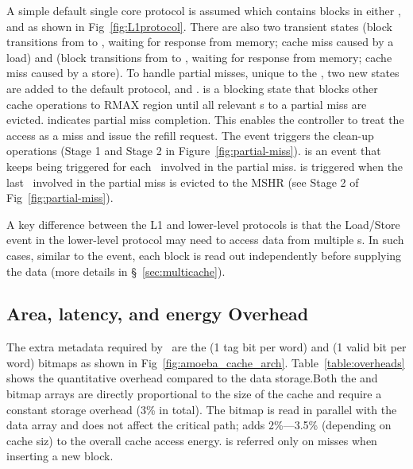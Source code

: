 \clearpage

A simple default single core protocol is assumed which contains blocks in either ,  and  as shown in Fig~\ref{fig:L1protocol}. There are also two transient states (block transitions from  to , waiting for  response from memory; cache miss caused by a load) and (block transitions from  to , waiting for  response from memory; cache miss caused by a store). To handle partial misses, unique to the \AC{}, two new states are added to the default protocol,  and .  is a blocking state that blocks other cache operations to RMAX region until all relevant \AB{}s to a partial miss are evicted.  indicates partial miss completion. This enables the controller to treat the access as a miss and issue the refill request. The  event triggers the clean-up operations (Stage 1 and Stage 2 in Figure~\ref{fig:partial-miss}).  is an event that keeps being triggered for each \AB\ involved in the partial miss.  is triggered when the last \AB\ involved in the partial miss is evicted to the MSHR (see Stage 2 of Fig~\ref{fig:partial-miss}).

A key difference between the L1 and lower-level protocols is that the Load/Store event in the lower-level protocol may need to access data from multiple \AB{}s. In such cases, similar to the  event, each block is read out independently before supplying the data (more details in \S~\ref{sec:multicache}).

\subsection{Area, latency, and energy Overhead}
\label{sec:area_latency_energy_overhead}

The extra metadata required by \AC\ are the (1 tag bit per word) and (1 valid bit per word) bitmaps as shown in Fig~\ref{fig:amoeba_cache_arch}. Table~\ref{table:overheads} shows the quantitative overhead compared to the data storage.Both the  and  bitmap arrays are directly proportional to the size of the cache and require a constant storage overhead (3\% in total). The  bitmap is read in parallel with the data array and does not affect the critical path;  adds 2\%---3.5\% (depending on cache siz) to the overall cache access energy. is referred only on misses when inserting a new block.

